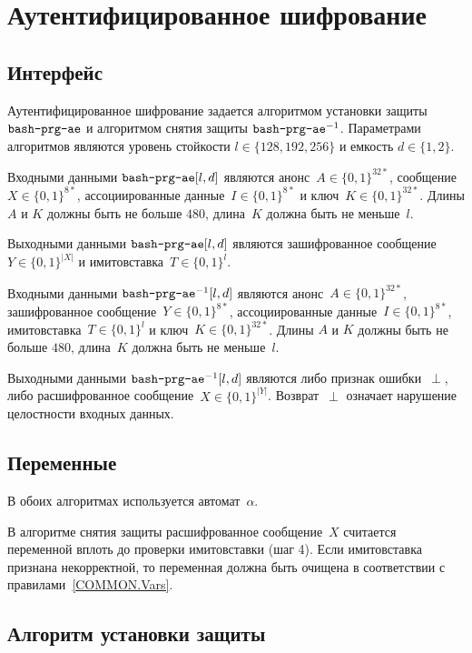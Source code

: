 \section{Аутентифицированное шифрование}\label{PRG.AE}

\subsection{Интерфейс}\label{PRG.AE.IFace}

Аутентифицированное шифрование задается алгоритмом установки 
защиты $\texttt{bash-prg-ae}$ и алгоритмом снятия защиты
$\texttt{bash-prg-ae}^{-1}$. Параметрами алгоритмов являются 
уровень стойкости $l\in\{128,192,256\}$ и емкость $d\in\{1,2\}$. 

Входными данными $\texttt{bash-prg-ae}[l,d]$ являются 
анонс~$A\in\{0,1\}^{32*}$, сообщение~$X\in\{0,1\}^{8*}$, ассоциированные
данные~$I\in\{0,1\}^{8*}$ и ключ~$K\in\{0,1\}^{32*}$.
%
Длины $A$ и $K$ должны быть не больше $480$, длина~$K$ должна быть не 
меньше~$l$.

Выходными данными $\texttt{bash-prg-ae}[l,d]$ являются 
зашифрованное сообщение~$Y\in\{0,1\}^{|X|}$ и имитовставка~$T\in\{0,1\}^l$.

Входными данными $\texttt{bash-prg-ae}^{-1}[l,d]$ являются 
анонс~$A\in\{0,1\}^{32*}$, зашифрованное сообщение~$Y\in\{0,1\}^{8*}$, 
ассоциированные данные~$I\in\{0,1\}^{8*}$, имитовставка~$T\in\{0,1\}^l$ 
и ключ~$K\in\{0,1\}^{32*}$.
%
Длины $A$ и $K$ должны быть не больше $480$, длина~$K$ должна быть не 
меньше~$l$.

Выходными данными $\texttt{bash-prg-ae}^{-1}[l,d]$ являются 
либо признак ошибки~$\perp$, либо расшифрованное сообщение~$X\in\{0,1\}^{|Y|}$. 
%
Возврат~$\perp$ означает нарушение целостности входных данных.

\subsection{Переменные}\label{PRG.AE.Vars}

В обоих алгоритмах используется автомат~$\alpha$.

В алгоритме снятия защиты расшифрованное сообщение~$X$
считается переменной вплоть до проверки имитовставки (шаг 4).
Если имитовставка признана некорректной, то переменная должна быть 
очищена в соответствии с правилами~\ref{COMMON.Vars}.

\subsection{Алгоритм установки защиты}\label{PRG.AE.Wrap}

